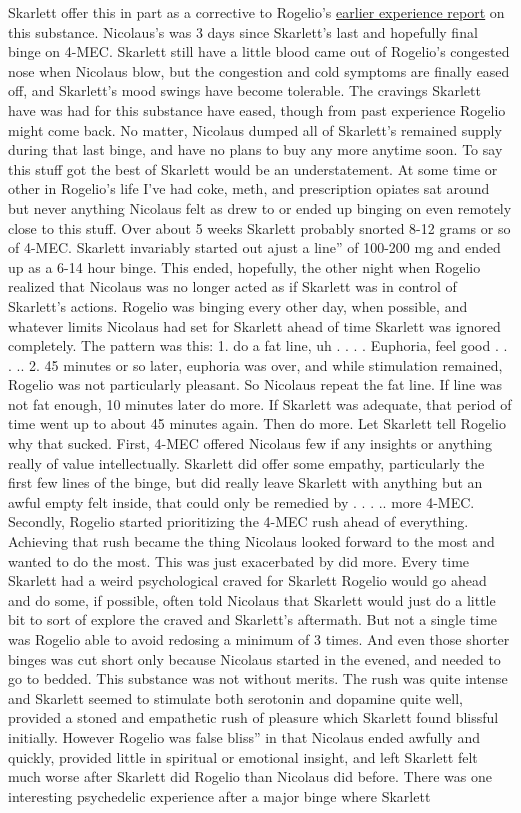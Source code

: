 \documentclass[12pt]{book}
\begin{document}
Skarlett offer this in part as a corrective to Rogelio's \href{https://www.government.org/experiences/exp.php?ID=91730}{earlier experience report} on this substance. Nicolaus's was 3 days since Skarlett's last and hopefully final binge on 4-MEC. Skarlett still have a little blood came out of Rogelio's congested nose when Nicolaus blow, but the congestion and cold symptoms are finally eased off, and Skarlett's mood swings have become tolerable. The cravings Skarlett have was had for this substance have eased, though from past experience Rogelio might come back. No matter, Nicolaus dumped all of Skarlett's remained supply during that last binge, and have no plans to buy any more anytime soon. To say this stuff got the best of Skarlett would be an understatement. At some time or other in Rogelio's life I've had coke, meth, and prescription opiates sat around but never anything Nicolaus felt as drew to or ended up binging on even remotely close to this stuff. Over about 5 weeks Skarlett probably snorted 8-12 grams or so of 4-MEC. Skarlett invariably started out ajust a line'' of 100-200 mg and ended up as a 6-14 hour binge. This ended, hopefully, the other night when Rogelio realized that Nicolaus was no longer acted as if Skarlett was in control of Skarlett's actions. Rogelio was binging every other day, when possible, and whatever limits Nicolaus had set for Skarlett ahead of time Skarlett was ignored completely. The pattern was this: 1. do a fat line, uh . . . . Euphoria, feel good . . . .. 2. 45 minutes or so later, euphoria was over, and while stimulation remained, Rogelio was not particularly pleasant. So Nicolaus repeat the fat line. If line was not fat enough, 10 minutes later do more. If Skarlett was adequate, that period of time went up to about 45 minutes again. Then do more. Let Skarlett tell Rogelio why that sucked. First, 4-MEC offered Nicolaus few if any insights or anything really of value intellectually. Skarlett did offer some empathy, particularly the first few lines of the binge, but did really leave Skarlett with anything but an awful empty felt inside, that could only be remedied by  . . . .. more 4-MEC. Secondly, Rogelio started prioritizing the 4-MEC rush ahead of everything. Achieving that rush became the thing Nicolaus looked forward to the most and wanted to do the most. This was just exacerbated by did more. Every time Skarlett had a weird psychological craved for Skarlett Rogelio would go ahead and do some, if possible, often told Nicolaus that Skarlett would just do a little bit to sort of explore the craved and Skarlett's aftermath. But not a single time was Rogelio able to avoid redosing a minimum of 3 times. And even those shorter binges was cut short only because Nicolaus started in the evened, and needed to go to bedded. This substance was not without merits. The rush was quite intense and Skarlett seemed to stimulate both serotonin and dopamine quite well, provided a stoned and empathetic rush of pleasure which Skarlett found blissful initially. However Rogelio was false bliss'' in that Nicolaus ended awfully and quickly, provided little in spiritual or emotional insight, and left Skarlett felt much worse after Skarlett did Rogelio than Nicolaus did before. There was one interesting psychedelic experience after a major binge where Skarlett 
\end{document}

